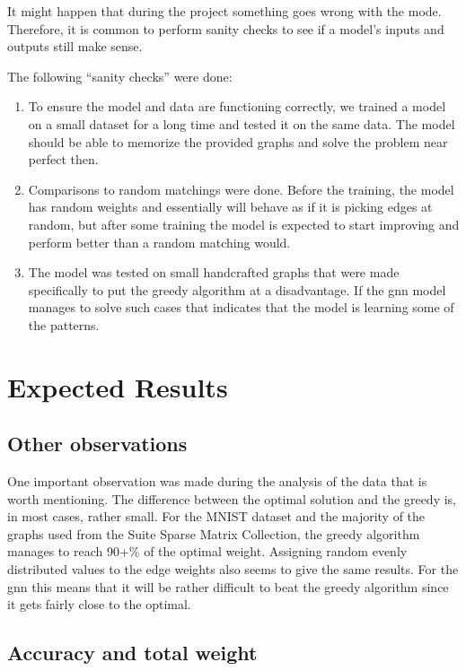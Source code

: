 It might happen that during the project something goes wrong with the mode. Therefore, it is common to perform sanity checks to see if a model's inputs and outputs still make sense.

The following “sanity checks” were done:

\begin{enumerate}
\item To ensure the model and data are functioning correctly, we trained a model on a small dataset for a long time and tested it on the same data. The model should be able to memorize the provided graphs and solve the problem near perfect then.

\item Comparisons to random matchings were done. Before the training, the model has random weights and essentially will behave as if it is picking edges at random, but after some training the model is expected to start improving and perform better than a random matching would.

\item The model was tested on small handcrafted graphs that were made specifically to put the greedy algorithm at a disadvantage. If the \gls{gnn} model manages to solve such cases that indicates that the model is learning some of the patterns.
\end{enumerate}	

\section{Expected Results}

\subsection{Other observations}

One important observation was made during the analysis of the data that is worth mentioning. The difference between the optimal solution and the greedy is, in most cases, rather small. For the MNIST dataset and the majority of the graphs used from the Suite Sparse Matrix Collection, the greedy algorithm manages to reach 90+\% of the optimal weight. Assigning random evenly distributed values to the edge weights also seems to give the same results. For the \gls{gnn} this means that it will be rather difficult to beat the greedy algorithm since it gets fairly close to the optimal.

\subsection{Accuracy and total weight}

